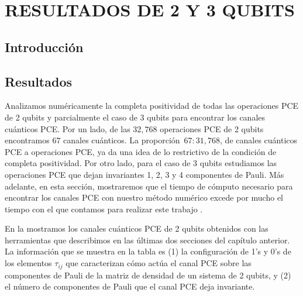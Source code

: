 \chapter{RESULTADOS DE 2 Y 3 QUBITS}
\section{Introducción}

\section{Resultados}
\noindent
{}

Analizamos numéricamente la completa positividad de todas 
las operaciones PCE de 2 qubits y parcialmente el caso de 3 qubits para 
encontrar los canales cuánticos PCE.
Por un lado, de las $32,768$ operaciones PCE de 2 qubits encontramos 
$67$ canales cuánticos. La proporción~$67:31,768$, de canales cuánticos PCE
a operaciones PCE, ya da una idea de lo restrictivo de la condición 
de completa positividad. Por otro lado, para el caso de 3 qubits 
estudiamos las operaciones PCE que dejan invariantes 1, 2, 3 y 4 
componentes de Pauli.
Más adelante, en esta sección, mostraremos que el tiempo de cómputo 
necesario para encontrar los canales PCE con nuestro método numérico
excede por mucho el tiempo con el que contamos para realizar este 
trabajo . 

\noindent
{}

En la  mostramos los canales cuánticos 
PCE de 2 qubits obtenidos con las herramientas que describimos en las 
últimas dos secciones del capítulo anterior. La información que se muestra
en la tabla es (1) la configuración de 1's y 0's de los elementos
$\tau_{ij}$ que caracterizan cómo actúa el canal PCE sobre las 
componentes de Pauli de la matriz de densidad de un sistema de 
2 qubits, y (2) el número de componentes de Pauli que el canal PCE
deja invariante. 

